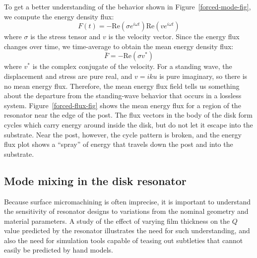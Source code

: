 \documentclass{article}
\renewcommand{\Re}{\mathrm{Re}}
\begin{document}
To get a better understanding of the behavior shown in 
Figure~\ref{forced-mode-fig}, we compute the energy density flux:
\begin{equation}
  F(t) = -\Re( \sigma e^{i \omega t} ) 
          \Re( v e^{i \omega t} )
\end{equation}
where $\sigma$ is the stress tensor and $v$ is the velocity vector.
Since the energy flux changes over time, we time-average to obtain
the mean energy density flux:
\begin{equation}
  \bar{F} = -\Re( \sigma v^* )
\end{equation}
where $v^*$ is the complex conjugate of the velocity.  For a standing
wave, the displacement and stress are pure real, and $v = iku$ is pure
imaginary, so there is no mean energy flux.  Therefore, the mean energy
flux field tells us something about the departure from the standing-wave
behavior that occurs in a lossless system.  Figure~\ref{forced-flux-fig}
shows the mean energy flux for a region of the resonator near the
edge of the post.  The flux vectors in the body of the disk form cycles
which carry energy around inside the disk, but do not let it escape into
the substrate.  Near the post, however, the cycle pattern is broken, and
the energy flux plot shows a ``spray'' of energy that travels down the
post and into the substrate.

\subsection{Mode mixing in the disk resonator}


Because surface micromachining is often imprecise, it is important
to understand the sensitivity of resonator designs to variations
from the nominal geometry and material parameters.  A study of the effect
of varying film thickness on the $Q$ value predicted by the resonator
illustrates the need for such understanding, and also the need for
simulation tools capable of teasing out subtleties that cannot easily
be predicted by hand models.
\end{document}
